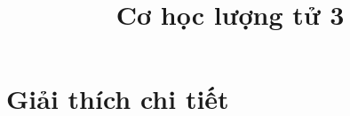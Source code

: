 \documentclass{article}
\title{\Huge{Cơ học lượng tử 3}}
\newcommand{\image}[1]{
	\begin{center}
		\texttt{[image: pic/\#1]}
	\end{center}
}
\newcommand{\f}[2]{\dfrac{#1}{#2}}
\begin{document}

\section{Giải thích chi tiết}
\end{document}
